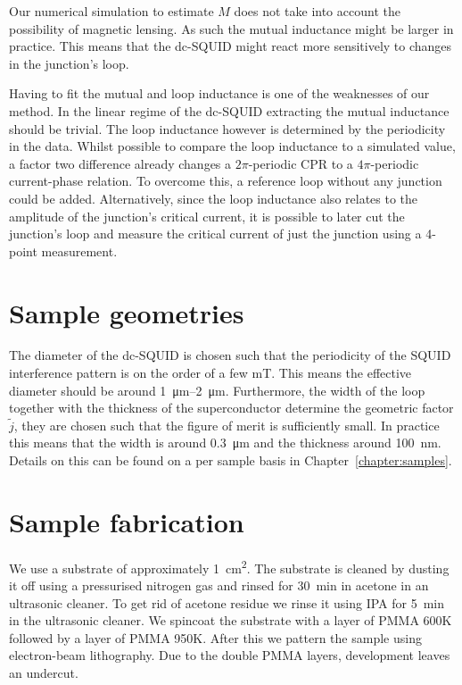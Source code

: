 Our numerical simulation to estimate $M$ does not take into account the possibility of magnetic lensing.\cite{prigozhin3DSimulationSuperconducting2018} As such the mutual inductance might be larger in practice. This means that the dc-SQUID might react more sensitively to changes in the junction's loop.

Having to fit the mutual and loop inductance is one of the weaknesses of our method. In the linear regime of the dc-SQUID extracting the mutual inductance should be trivial. The loop inductance however is determined by the periodicity in the data. Whilst possible to compare the loop inductance to a simulated value, a factor two difference already changes a $2\pi$-periodic CPR to a $4\pi$-periodic current-phase relation. To overcome this, a reference loop without any junction could be added. Alternatively, since the loop inductance also relates to the amplitude of the junction's critical current, it is possible to later cut the junction's loop and measure the critical current of just the junction using a 4-point measurement.

\section{Sample geometries}
The diameter of the dc-SQUID is chosen such that the periodicity of the SQUID interference pattern is on the order of a few \unit{\milli\tesla}. This means the effective diameter should be around \qtyrange{1}{2}{\micro\meter}. Furthermore, the width of the loop together with the thickness of the superconductor determine the geometric factor $\tilde{j}$, they are chosen such that the figure of merit is sufficiently small. In practice this means that the width is around \qty{0.3}{\micro\meter} and the thickness around \qty{100}{\nano\meter}. Details on this can be found on a per sample basis in Chapter~\ref{chapter:samples}.

\section{Sample fabrication}
\label{sec:method-sample-fabrication}
We use a  substrate of approximately \qty{1}{\square\centi\meter}. The substrate is cleaned by dusting it off using a pressurised nitrogen gas and rinsed for \qty{30}{\minute} in acetone in an ultrasonic cleaner. To get rid of acetone residue we rinse it using IPA for \qty{5}{\minute} in the ultrasonic cleaner. We spincoat the substrate with a layer of PMMA 600K followed by a layer of PMMA 950K. After this we pattern the sample using electron-beam lithography. Due to the double PMMA layers, development leaves an undercut.

